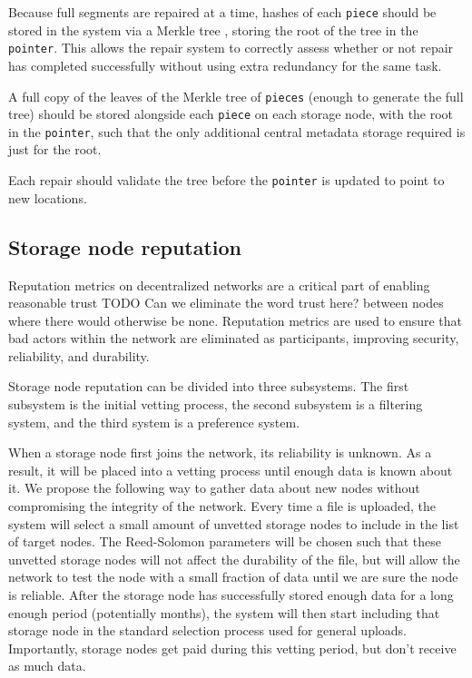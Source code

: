 \documentclass[a4paper,10pt]{article} \usepackage[utf8]{inputenc}
\newcommand{\x}[1]{{\tt #1}} \newcommand{\code}[1]{{\tt #1}}
\newcommand{\todo}[1]{{\color{red} TODO #1 }}
\begin{document}
Because full segments are repaired at a time, hashes of
each \x{piece} should be stored in the system via a Merkle tree
\cite{merkle-tree}, storing the root of the tree in the \x{pointer}. This allows
the repair system to correctly assess whether or not repair has completed
successfully without using extra redundancy for the same task.

A full copy of the leaves of the Merkle tree of \x{pieces} (enough to generate
the full tree) should be stored alongside each \x{piece} on each storage node,
with the root in the \x{pointer}, such that the only additional central
metadata storage required is just for the root.

Each repair should validate the tree before the \x{pointer} is updated to 
point to new locations.

\subsection{Storage node reputation}

Reputation metrics on decentralized networks are a critical part of 
enabling reasonable trust \todo{Can we eliminate the word trust here?} between nodes 
where there would otherwise be none. Reputation metrics
are used to ensure that bad actors
within the network are eliminated as participants, improving security,
reliability, and durability.

Storage node reputation can be divided into three subsystems. The first
subsystem is the initial vetting process, the second subsystem is a filtering
system, and the third system is a preference system.

When a storage node first joins the network, its reliability is unknown.
As a result, it will be placed into a vetting
process until enough data is known about it.
We propose the following way to gather data about new nodes
without compromising the integrity of the network.
Every time a file is uploaded, the system will select a small amount of
unvetted storage nodes to include in the list of target nodes.
The Reed-Solomon parameters will be chosen such that these unvetted storage
nodes will not affect the durability of the file, but will allow the network 
to test the node 
with a small fraction of data until we are sure the node is reliable.
After the storage node has successfully stored enough data for a long enough
period (potentially months), 
the system will then start including that storage
node in the standard selection process used for general uploads. 
Importantly, storage nodes get paid during this
vetting period, but don't receive as much data.
\end{document}
